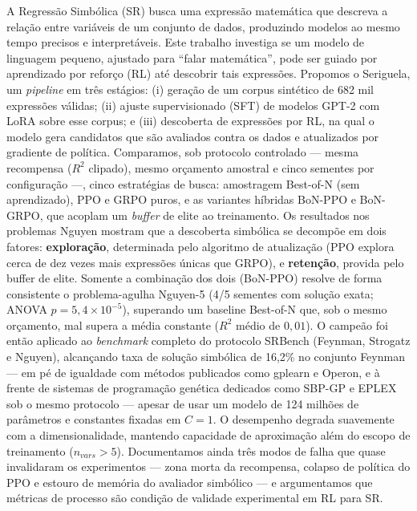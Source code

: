 \documentclass[Ingles, hidelinks]{ic-tese-v3} %
\begin{document}
\begin{resumo}
A Regressão Simbólica (SR) busca uma expressão matemática que descreva a relação entre variáveis de um conjunto de dados, produzindo modelos ao mesmo tempo precisos e interpretáveis. Este trabalho investiga se um modelo de linguagem pequeno, ajustado para ``falar matemática'', pode ser guiado por aprendizado por reforço (RL) até descobrir tais expressões. Propomos o Seriguela, um \textit{pipeline} em três estágios: (i) geração de um corpus sintético de 682 mil expressões válidas; (ii) ajuste supervisionado (SFT) de modelos GPT-2 com LoRA sobre esse corpus; e (iii) descoberta de expressões por RL, na qual o modelo gera candidatos que são avaliados contra os dados e atualizados por gradiente de política. Comparamos, sob protocolo controlado — mesma recompensa ($R^2$ clipado), mesmo orçamento amostral e cinco sementes por configuração —, cinco estratégias de busca: amostragem Best-of-N (sem aprendizado), PPO e GRPO puros, e as variantes híbridas BoN-PPO e BoN-GRPO, que acoplam um \textit{buffer} de elite ao treinamento. Os resultados nos problemas Nguyen mostram que a descoberta simbólica se decompõe em dois fatores: \textbf{exploração}, determinada pelo algoritmo de atualização (PPO explora cerca de dez vezes mais expressões únicas que GRPO), e \textbf{retenção}, provida pelo buffer de elite. Somente a combinação dos dois (BoN-PPO) resolve de forma consistente o problema-agulha Nguyen-5 (4/5 sementes com solução exata; ANOVA $p=5{,}4\times10^{-5}$), superando um baseline Best-of-N que, sob o mesmo orçamento, mal supera a média constante ($R^2$ médio de $0{,}01$). O campeão foi então aplicado ao \textit{benchmark} completo do protocolo SRBench (Feynman, Strogatz e Nguyen), alcançando taxa de solução simbólica de 16,2\% no conjunto Feynman — em pé de igualdade com métodos publicados como gplearn e Operon, e à frente de sistemas de programação genética dedicados como SBP-GP e EPLEX sob o mesmo protocolo — apesar de usar um modelo de 124 milhões de parâmetros e constantes fixadas em $C=1$. O desempenho degrada suavemente com a dimensionalidade, mantendo capacidade de aproximação além do escopo de treinamento ($n_{vars}>5$). Documentamos ainda três modos de falha que quase invalidaram os experimentos — zona morta da recompensa, colapso de política do PPO e estouro de memória do avaliador simbólico — e argumentamos que métricas de processo são condição de validade experimental em RL para SR.
\end{resumo}
\end{document}
